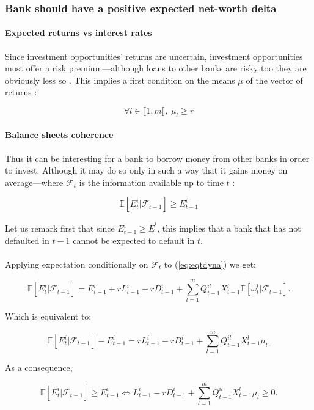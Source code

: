 \documentclass{article}
\begin{document}
\subsubsection{Bank should have a positive expected net-worth delta}\label{expected losers}

\paragraph{Expected returns vs interest rates}
Since investment opportunities' returns are uncertain, investment opportunities must offer a risk premium---although loans to other banks are risky too they are obviously less so . This implies a first condition on the means $\mu$ of the vector of returns :

    $$ \forall l \in \llbracket 1, m \rrbracket,~ \mu_l \geq r $$
    
    
\paragraph{Balance sheets coherence}
Thus it can be interesting for a bank to borrow money from other banks in order to invest. Although it may do so only in such a way that it gains money on average---where $\mathcal{F}_t$ is the information available up to time $t$  :

$$ \mathbb{E}[E_t ^i|\mathcal{F}_{t-1}] \geq E_{t-1}^i $$

Let us remark first that since $E_{t-1}^i \geq \bar{E}^i$, this implies that a bank that has not defaulted in $t-1$ cannot be expected to default in $t$.

\paragraph{}
Applying expectation conditionally on $\mathcal{F}_t$ to (\ref{eq:eqtdyna}) we get: 

$$\mathbb{E}[E_t^i|\mathcal{F}_{t-1}] = E_{t-1}^i + rL_{t-1}^i - rD_{t-1}^i + \sum_{l=1}^{m} Q_{t-1}^{il} X_{t-1}^l \mathbb{E}[\omega_t^l|\mathcal{F}_{t-1}].$$

Which is equivalent to:

$$\mathbb{E}[E_t ^i|\mathcal{F}_{t-1}] - E_{t-1} ^i = rL_{t-1}^i - rD_{t-1}^i + \sum_{l=1}^{m} Q_{t-1}^{il} X^l_{t-1}\mu_l.$$

As a consequence, 

$$ \mathbb{E}[E_t ^i|\mathcal{F}_{t-1}] \geq E_{t-1}^i \Leftrightarrow L_{t-1}^i - rD_{t-1}^i + \sum_{l=1}^{m} Q_{t-1}^{il} X^l_{t-1}\mu_l \geq 0.$$
\end{document}
